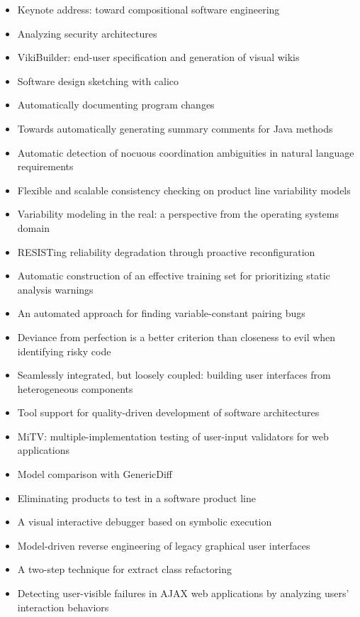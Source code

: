 {\small
\begin{itemize}[itemsep=-1ex]
  \item Keynote address: toward compositional software engineering
  \item Analyzing security architectures
  \item VikiBuilder: end-user specification and generation of visual wikis
  \item Software design sketching with calico
  \item Automatically documenting program changes
  \item Towards automatically generating summary comments for Java methods
  \item Automatic detection of nocuous coordination ambiguities in natural language requirements
  \item Flexible and scalable consistency checking on product line variability models
  \item Variability modeling in the real: a perspective from the operating systems domain
  \item RESISTing reliability degradation through proactive reconfiguration
  \item Automatic construction of an effective training set for prioritizing static analysis warnings
  \item An automated approach for finding variable-constant pairing bugs
  \item Deviance from perfection is a better criterion than closeness to evil when identifying risky code
  \item Seamlessly integrated, but loosely coupled: building user interfaces from heterogeneous components
  \item Tool support for quality-driven development of software architectures
  \item MiTV: multiple-implementation testing of user-input validators for web applications
  \item Model comparison with GenericDiff
  \item Eliminating products to test in a software product line
  \item A visual interactive debugger based on symbolic execution
  \item Model-driven reverse engineering of legacy graphical user interfaces
  \item A two-step technique for extract class refactoring
  \item Detecting user-visible failures in AJAX web applications by analyzing users' interaction behaviors

\end{itemize}}
